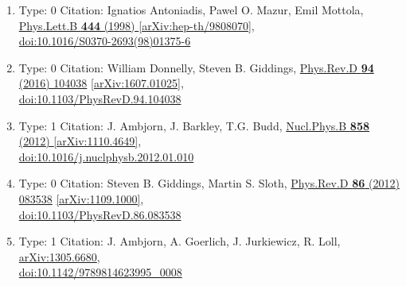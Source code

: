 \documentclass[a4paper,10pt]{article}
\begin{document}
\begin{enumerate}
\begin{enumerate}
  \item Type: 0 Citation: Ignatios Antoniadis, Pawel O. Mazur, Emil Mottola, \href{https://www.doi.org/10.1016/S0370-2693(98)01375-6}{Phys.Lett.B {\bf 444} (1998) }  \href{https://arxiv.org/abs/hep-th/9808070}{[arXiv:hep-th/9808070]},\\\href{https://www.doi.org/10.1016/S0370-2693(98)01375-6}{doi:10.1016/S0370-2693(98)01375-6}
  \item Type: 0 Citation: William Donnelly, Steven B. Giddings, \href{https://www.doi.org/10.1103/PhysRevD.94.104038}{Phys.Rev.D {\bf 94} (2016) 104038}  \href{https://arxiv.org/abs/1607.01025}{[arXiv:1607.01025]},\\\href{https://www.doi.org/10.1103/PhysRevD.94.104038}{doi:10.1103/PhysRevD.94.104038}
  \item Type: 1 Citation: J. Ambjorn, J. Barkley, T.G. Budd, \href{https://www.doi.org/10.1016/j.nuclphysb.2012.01.010}{Nucl.Phys.B {\bf 858} (2012) }  \href{https://arxiv.org/abs/1110.4649}{[arXiv:1110.4649]},\\\href{https://www.doi.org/10.1016/j.nuclphysb.2012.01.010}{doi:10.1016/j.nuclphysb.2012.01.010}
  \item Type: 0 Citation: Steven B. Giddings, Martin S. Sloth, \href{https://www.doi.org/10.1103/PhysRevD.86.083538}{Phys.Rev.D {\bf 86} (2012) 083538}  \href{https://arxiv.org/abs/1109.1000}{[arXiv:1109.1000]},\\\href{https://www.doi.org/10.1103/PhysRevD.86.083538}{doi:10.1103/PhysRevD.86.083538}
  \item Type: 1 Citation: J. Ambjorn, A. Goerlich, J. Jurkiewicz, R. Loll, \href{https://arxiv.org/abs/1305.6680}{arXiv:1305.6680},\\\href{https://www.doi.org/10.1142/9789814623995_0008}{doi:10.1142/9789814623995\_0008}

\end{enumerate}
\end{enumerate}
\end{document}
